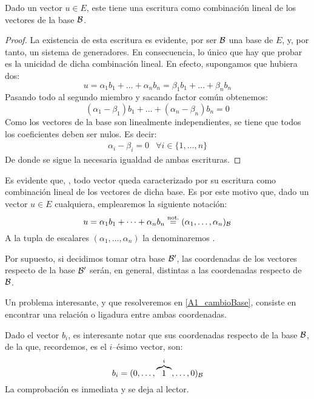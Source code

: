 \begin{prop}
	\label{A1_prop_escrituraUnicaVector}
	Dado un vector $u\in E$, este tiene una escritura  como combinación lineal de los vectores de la base $\mathcal{B}$.
\end{prop}
\begin{proof}
	La existencia de esta escritura es evidente, por ser $\mathcal{B}$ una base de $E$, y, por tanto, un sistema de generadores. En consecuencia, lo único que hay que probar es la unicidad de dicha combinación lineal. En efecto, supongamos que hubiera dos:
	\[u=\alpha_1b_1+\dots+\alpha_nb_n=\beta_1b_1+\dots+\beta_nb_n
	\]
	Pasando todo al segundo miembro y sacando factor común obtenemos:
	\[(\alpha_1-\beta_1)b_1+\dots+(\alpha_n-\beta_n)b_n=0\]
	Como los vectores de la base son linealmente independientes, se tiene que todos los coeficientes deben ser nulos. Es decir:
	\[\begin{array}{lr}
	\alpha_i-\beta_i=0 & \forall i\in\{1,\dots,n\}
	\end{array}\]
	De donde se sigue la necesaria igualdad de ambas escrituras.
\end{proof}
\begin{obs}
	\label{A1_obs_coordenadasVector}
	Es evidente que, , todo vector queda caracterizado por su escritura como combinación lineal de los vectores de dicha base. Es por este motivo que, dado un vector $u\in E$ cualquiera, emplearemos la siguiente notación:
	\[
		u = \alpha_1b_1+\dots+\alpha_nb_n\stackrel{\textrm{not.}}{=}(\alpha_1,\dots,\alpha_n)_{\mathcal{B}}
	\]
	A la tupla de escalares $(\alpha_1,\dots,\alpha_n)$ la denominaremos .
\end{obs}
Por supuesto, si decidimos tomar otra base $\mathcal{B}'$, las coordenadas de los vectores respecto de la base $\mathcal{B}'$ serán, en general, distintas a las coordenadas respecto de $\mathcal{B}$.

Un problema interesante, y que resolveremos en \ref{A1_cambioBase}, consiste en encontrar una relación o ligadura entre ambas coordenadas.

\begin{obs}
	\label{A1_obs_coordenadasVectorBase}
	Dado el vector $b_i$, es interesante notar que sus coordenadas respecto de la base $\mathcal{B}$, de la que, recordemos, es el $i$--ésimo vector, son:
	\[
	b_i=(0,\dots,\overbrace{1}^{i},\dots,0)_{\mathcal{B}}
	\]
	La comprobación es inmediata y se deja al lector.
\end{obs}
